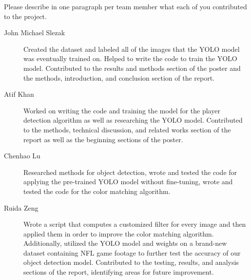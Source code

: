 Please describe in one paragraph per team member what each of you contributed to the project.
\begin{description}
\item[John Michael Slezak] Created the dataset and labeled all of the images that the YOLO model was eventually trained on. Helped to write the code to train the YOLO model. Contributed to the results and methods section of the poster and the methods, introduction, and conclusion section of the report. 
\item[Atif Khan] Worked on writing the code and training the model for the player detection algorithm as well as researching the YOLO model. Contributed to the methods, technical discussion, and related works section of the report as well as the beginning sections of the poster.
\item [Chenhao Lu] Researched methods for object detection, wrote and tested the code for applying the pre-trained YOLO model without fine-tuning, wrote and tested the code for the color matching algorithm.
\item [Ruida Zeng] Wrote a script that computes a customized filter for every image and then applied them in order to improve the color matching algorithm. Additionally, utilized the YOLO model and weights on a brand-new dataset containing NFL game footage to further test the accuracy of our object detection model. Contributed to the testing, results, and analysis sections of the report, identifying areas for future improvement.
\end{description}


